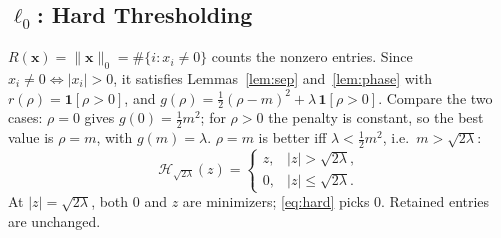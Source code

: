 \documentclass[11pt,a4paper]{article}
\theoremstyle{definition}
\begin{document}
\subsection{\texorpdfstring{$\ell_0$}{L0}: Hard Thresholding}

$R(\mathbf x) = \lVert\mathbf x\rVert_0 = \#\{i: x_i\neq 0\}$ counts the nonzero entries. Since
$x_i\neq0 \Leftrightarrow |x_i|>0$, it satisfies Lemmas~\ref{lem:sep} and~\ref{lem:phase} with $r(\rho) = \mathbf 1[\rho>0]$, and
$g(\rho) = \tfrac12(\rho-m)^2 + \lambda\,\mathbf 1[\rho>0]$. Compare the two cases:
$\rho=0$ gives $g(0) = \tfrac12 m^2$; for $\rho>0$ the penalty is constant, so the
best value is $\rho = m$, with $g(m) = \lambda$. $\rho=m$ is better iff
$\lambda<\tfrac12 m^2$, i.e.\ $m>\sqrt{2\lambda}$:
\begin{equation}\label{eq:hard}
  \mathcal H_{\sqrt{2\lambda}}(z) = \begin{cases} z, & |z|>\sqrt{2\lambda},\\ 0, & |z|\le\sqrt{2\lambda}.\end{cases}
\end{equation}
At $|z|=\sqrt{2\lambda}$, both $0$ and $z$ are minimizers; \eqref{eq:hard} picks $0$.
Retained entries are unchanged.
\end{document}

